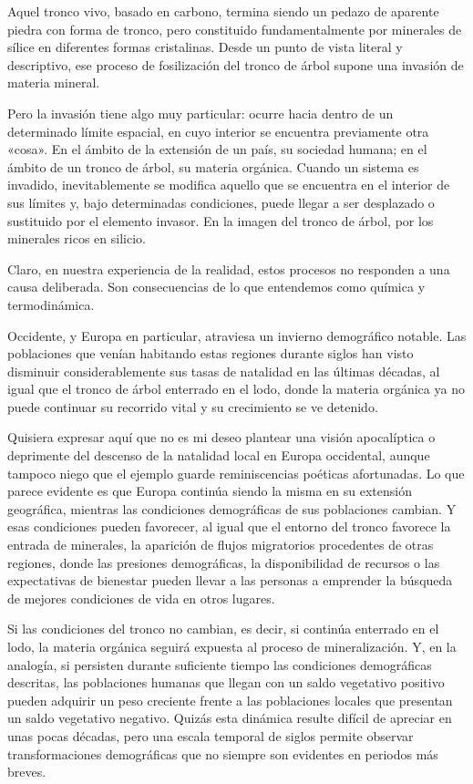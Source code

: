 \documentclass[12pt,a4paper]{article}
\begin{document}
Aquel tronco vivo, basado en carbono, termina siendo un pedazo de aparente piedra con forma de tronco, pero constituido fundamentalmente por minerales de sílice en diferentes formas cristalinas. Desde un punto de vista literal y descriptivo, ese proceso de fosilización del tronco de árbol supone una invasión de materia mineral.

Pero la invasión tiene algo muy particular: ocurre hacia dentro de un determinado límite espacial, en cuyo interior se encuentra previamente otra «cosa». En el ámbito de la extensión de un país, su sociedad humana; en el ámbito de un tronco de árbol, su materia orgánica. Cuando un sistema es invadido, inevitablemente se modifica aquello que se encuentra en el interior de sus límites y, bajo determinadas condiciones, puede llegar a ser desplazado o sustituido por el elemento invasor. En la imagen del tronco de árbol, por los minerales ricos en silicio.

Claro, en nuestra experiencia de la realidad, estos procesos no responden a una causa deliberada. Son consecuencias de lo que entendemos como química y termodinámica.

Occidente, y Europa en particular, atraviesa un invierno demográfico notable. Las poblaciones que venían habitando estas regiones durante siglos han visto disminuir considerablemente sus tasas de natalidad en las últimas décadas, al igual que el tronco de árbol enterrado en el lodo, donde la materia orgánica ya no puede continuar su recorrido vital y su crecimiento se ve detenido.

Quisiera expresar aquí que no es mi deseo plantear una visión apocalíptica o deprimente del descenso de la natalidad local en Europa occidental, aunque tampoco niego que el ejemplo guarde reminiscencias poéticas afortunadas. Lo que parece evidente es que Europa continúa siendo la misma en su extensión geográfica, mientras las condiciones demográficas de sus poblaciones cambian. Y esas condiciones pueden favorecer, al igual que el entorno del tronco favorece la entrada de minerales, la aparición de flujos migratorios procedentes de otras regiones, donde las presiones demográficas, la disponibilidad de recursos o las expectativas de bienestar pueden llevar a las personas a emprender la búsqueda de mejores condiciones de vida en otros lugares.

Si las condiciones del tronco no cambian, es decir, si continúa enterrado en el lodo, la materia orgánica seguirá expuesta al proceso de mineralización. Y, en la analogía, si persisten durante suficiente tiempo las condiciones demográficas descritas, las poblaciones humanas que llegan con un saldo vegetativo positivo pueden adquirir un peso creciente frente a las poblaciones locales que presentan un saldo vegetativo negativo. Quizás esta dinámica resulte difícil de apreciar en unas pocas décadas, pero una escala temporal de siglos permite observar transformaciones demográficas que no siempre son evidentes en periodos más breves.
\end{document}
